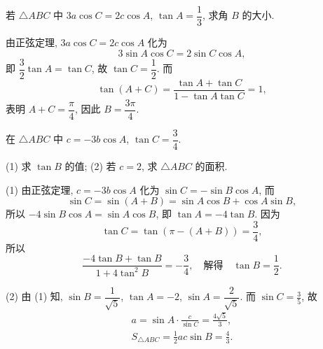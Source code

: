\begin{exercise}
    若 $\triangle ABC$ 中 $3a\cos C=2c\cos A$, $\tan A=\dfrac13$, 求角 $B$ 的大小.
\end{exercise}
\beginsolution
    由正弦定理, 
    $3a\cos C=2c\cos A$ 化为
    \[3\sin A\cos C= 2\sin C\cos A,\]
    即 $\dfrac32\tan A= \tan C$, 故 $\tan C= \dfrac12$. 而
    \[\tan(A+C)= \frac{\tan A+\tan C}{1- \tan A\tan C}= 1,\]
    表明 $A+C= \dfrac\pi4$, 因此 $B= \dfrac{3\pi}4$.
\endsolution

\begin{exercise}
    在 $\triangle ABC$ 中 $c=-3b\cos A$, $\tan C=\dfrac34$.
    
    (1) 求 $\tan B$ 的值;\qquad
    (2) 若 $c=2$, 求 $\triangle ABC$ 的面积.
\end{exercise}
\beginsolution
    (1) 由正弦定理, $c=-3b\cos A$ 化为 $\sin C= -\sin B\cos A$, 而
    \[\sin C= \sin(A+B)= \sin A\cos B+\cos A\sin B,\]
    所以 $-4\sin B\cos A= \sin A\cos B$, 即 $\tan  A= -4\tan B$. 因为
    \[\tan C= \tan(\pi-(A+B))= \dfrac34,\]
    所以
    \[\frac{-4\tan B+\tan B}{1+ 4\tan^2 B}= -\frac34,\quad
        \text{解得}\quad \tan B= \frac12.\]
    
    (2) 由 (1) 知, $\sin B= \dfrac1{\sqrt5}$, $\tan A= -2$, $\sin A= \dfrac2{\sqrt5}$. 而 $\sin C=\frac35$, 故
    \[\begin{gathered}
        a= \sin A\cdot \frac{c}{\sin C}= \frac{4\sqrt5}{3},\\
        S_{\triangle ABC}= \frac12 ac\sin B= \frac43.
    \end{gathered}\]
\endsolution
